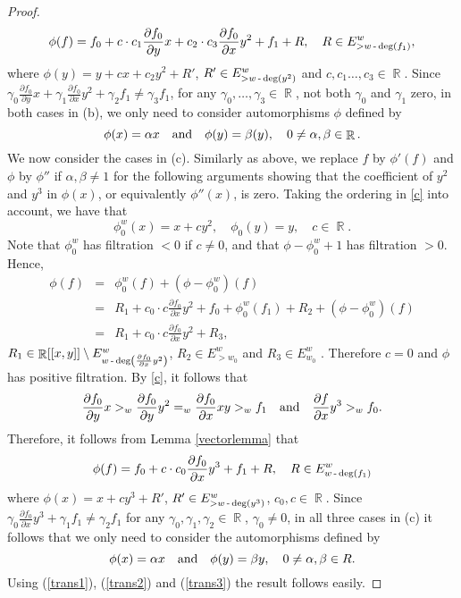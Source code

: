 \documentclass[noend]{amsproc}
\theoremstyle{definition}
\DeclareMathOperator{\R}{\mathbb{R}}
\DeclareMathOperator{\dash}{\textnormal{-}}
\begin{document}
\begin{proof}
\begin{equation*}
\phi(f) = f_0+c\cdot c_1\frac{\partial f_0}{\partial y}x+c_2\cdot c_3\frac{\partial f_0}{\partial x}y^2+f_1+R,\quad R\in E^w_{>w\dash\deg(f_1)},
\end{equation*}
where $\phi(y) = y+cx+c_2y^2+R'$, $R'\in E^w_{>w\dash\deg(y^2)}$ and $c,c_1\ldots,c_3\in\R$.
Since $\gamma_0\frac{\partial f_0}{\partial y}x+\gamma_1\frac{\partial f_0}{\partial x}y^2+\gamma_2f_1\neq \gamma_3f_1$, for any $\gamma_0,\ldots,\gamma_3\in\R$,  not both $\gamma_0$ and $\gamma_1$ zero, in both cases in (b), we only need to consider automorphisms $\phi$ defined by 
\begin{equation}\label{trans2}
\phi(x)=\alpha x\quad\textnormal{and}\quad\phi(y)=\beta(y),\quad0\neq\alpha,\beta\in\R.
\end{equation}
We now consider the cases in (c). Similarly as above, we replace $f$ by $\phi'(f)$ and $\phi$ by $\phi''$ if $\alpha,\beta\neq 1$ for the following arguments showing that the coefficient of $y^2$ and $y^3$ in $\phi(x)$, or equivalently $\phi''(x)$, is zero. Taking the ordering in \ref{c} into account, we have that \[\phi_0^w(x)=x+cy^2, \quad\phi_0(y)=y,\quad c\in\R.\] Note that $\phi^w_0$ has filtration $<0$ if $c\neq 0$, and that $\phi-\phi^w_0+1$ has filtration $>0$. Hence,
\begin{eqnarray*}
\phi(f)&=&\phi_0^w(f)+(\phi-\phi^w_0)(f)\\
&=& R_1+c_0\cdot c\frac{\partial f_0}{\partial x}y^2+f_0+\phi^w_0(f_1)+R_2 +(\phi-\phi^w_0)(f)\\
&=&R_1+c_0\cdot c\frac{\partial f_0}{\partial x}y^2+R_3,
\end{eqnarray*} 
$R_1\in\R[[x,y]]\setminus E^w_{w\dash\deg\left(\frac{\partial f_0}{\partial x}y^2\right)}$, $R_2\in E^w_{>w_0}$ and $R_3\in E^w_{w_0}$ . Therefore $c=0$ and $\phi$ has positive filtration.
By \ref{c}, it follows that
\begin{equation*}
\frac{\partial f_0}{\partial y}x >_w\frac{\partial f_0}{\partial y}y^2 =_w \frac{\partial f_0}{\partial x}xy>_w  f_1\quad\textnormal{and}\quad \frac{\partial f}{\partial x}y^3>_w f_0.
\end{equation*}
Therefore, it follows from Lemma \ref{vectorlemma} that
\begin{equation*}
\phi(f) = f_0+c\cdot c_0\frac{\partial f_0}{\partial x}y^3+f_1+R,\quad R\in E^w_{w\dash\deg(f_1)}
\end{equation*}
where $\phi(x) = x+ cy^3+R'$, $R'\in E^w_{>w\dash\deg(y^3)}$, $c_0,c\in\R$. Since $\gamma_0\frac{\partial f_0}{\partial x}y^3+\gamma_1f_1\neq \gamma_2f_1$ for any $\gamma_0,\gamma_1,\gamma_2\in\R$, $\gamma_0\neq 0$, in all three cases in (c) it follows that we only need to consider the automorphisms defined by
\begin{equation}\label{trans3}
\phi(x) = \alpha x\quad\textnormal{and}\quad\phi(y)=\beta y,\quad0\neq\alpha,\beta\in R.
\end{equation}
Using (\ref{trans1}), (\ref{trans2}) and (\ref{trans3}) the result follows easily.
\end{proof}
\end{document}
